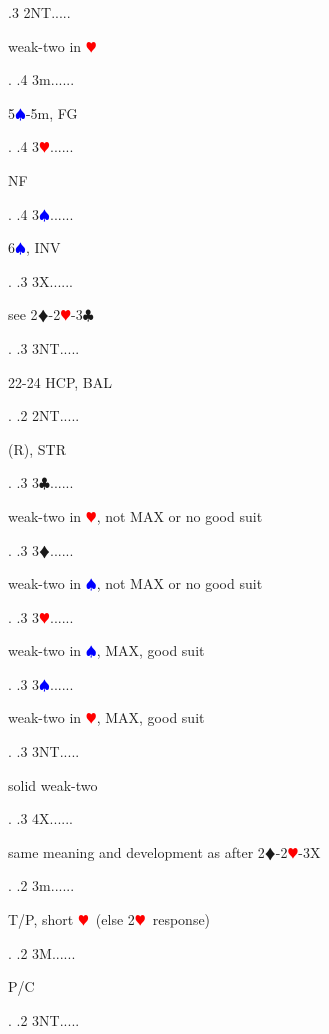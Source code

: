\documentclass[a4paper]{article}
\newcommand{\BC}{\textcolor{OliveGreen}{$\clubsuit$}}
\newcommand{\BD}{\textcolor{RedOrange}{$\vardiamondsuit$}}
\newcommand{\BH}{\textcolor{Red}{$\varheartsuit${}}}
\newcommand{\BS}{\textcolor{Blue}{$\spadesuit${}}}
\begin{document}
{ .3 2NT.....\begin{minipage}[t]{0.8\textwidth}
weak-two in \BH 
\end{minipage}. 
 .4 3m......\begin{minipage}[t]{0.8\textwidth}
5\BS -5m, FG
\end{minipage}. 
 .4 3\BH......\begin{minipage}[t]{0.8\textwidth}
NF
\end{minipage}. 
 .4 3\BS......\begin{minipage}[t]{0.8\textwidth}
6\BS , INV
\end{minipage}. 
 .3 3X......\begin{minipage}[t]{0.8\textwidth}
see 2\BD -2\BH -3\BC 
\end{minipage}. 
 .3 3NT.....\begin{minipage}[t]{0.8\textwidth}
22-24 HCP, BAL
\end{minipage}. 
 .2 2NT.....\begin{minipage}[t]{0.8\textwidth}
(R), STR
\end{minipage}. 
 .3 3\BC......\begin{minipage}[t]{0.8\textwidth}
weak-two in \BH , not MAX or no good suit
\end{minipage}. 
 .3 3\BD......\begin{minipage}[t]{0.8\textwidth}
weak-two in \BS , not MAX or no good suit
\end{minipage}. 
 .3 3\BH......\begin{minipage}[t]{0.8\textwidth}
weak-two in \BS , MAX, good suit
\end{minipage}. 
 .3 3\BS......\begin{minipage}[t]{0.8\textwidth}
weak-two in \BH , MAX, good suit
\end{minipage}. 
 .3 3NT.....\begin{minipage}[t]{0.8\textwidth}
solid weak-two
\end{minipage}. 
 .3 4X......\begin{minipage}[t]{0.8\textwidth}
same meaning and development as after 2\BD -2\BH -3X
\end{minipage}. 
 .2 3m......\begin{minipage}[t]{0.8\textwidth}
T/P, short \BH\ (else 2\BH\ response)
\end{minipage}. 
 .2 3M......\begin{minipage}[t]{0.8\textwidth}
P/C
\end{minipage}. 
 .2 3NT.....\begin{minipage}[t]{0.8\textwidth}

\end{minipage}}
\end{document}

